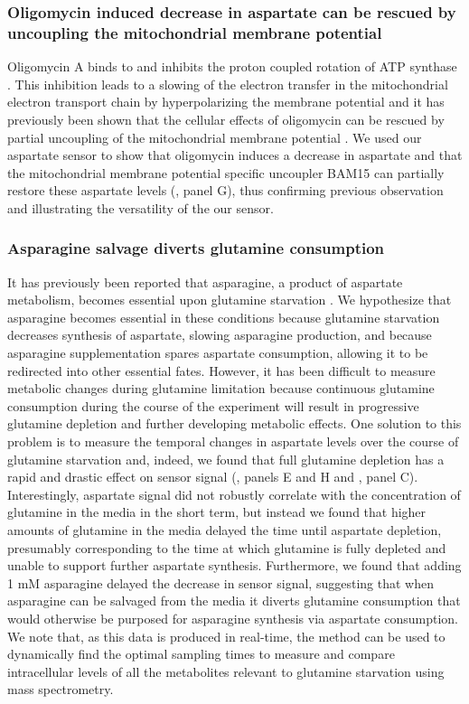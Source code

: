 \documentclass[9pt,lineno]{elife}
\begin{document}
\subsubsection{Oligomycin induced decrease in aspartate can be rescued by uncoupling the mitochondrial membrane potential}
Oligomycin A binds to and inhibits the proton coupled rotation of ATP synthase \citep{Symersky2012-dv}.
This inhibition leads to a slowing of the electron transfer in the mitochondrial electron transport chain by hyperpolarizing the membrane potential \citep{Brand2011-ms} and it has previously been shown that the cellular effects of oligomycin can be rescued by partial uncoupling of the mitochondrial membrane potential \citep{Sullivan2015-xf}. 
We used our aspartate sensor to show that oligomycin induces a decrease in aspartate and that the mitochondrial membrane potential specific uncoupler BAM15 \citep{Kenwood2014-ni} can partially restore these aspartate levels (, panel G), thus confirming previous observation and illustrating the versatility of the our sensor.




\subsubsection{Asparagine salvage diverts glutamine consumption}
It has previously been reported that asparagine, a product of aspartate metabolism, becomes essential upon glutamine starvation \citep{Pavlova2018-nl, Zhang2014-zz}.
We hypothesize that asparagine becomes essential in these conditions because glutamine starvation decreases synthesis of aspartate, slowing asparagine production, and because asparagine supplementation spares aspartate consumption, allowing it to be redirected into other essential fates.
However, it has been difficult to measure metabolic changes during glutamine limitation because continuous glutamine consumption during the course of the experiment will result in progressive glutamine depletion and further developing metabolic effects.
One solution to this problem is to measure the temporal changes in aspartate levels over the course of glutamine starvation and, indeed, we found that full glutamine depletion has a rapid and drastic effect on sensor signal (, panels E and H and , panel C).
Interestingly, aspartate signal did not robustly correlate with the concentration of glutamine in the media in the short term, but instead we found that higher amounts of glutamine in the media delayed the time until aspartate depletion, presumably corresponding to the time at which glutamine is fully depleted and unable to support further aspartate synthesis.
Furthermore, we found that adding 1 mM asparagine delayed the decrease in sensor signal, suggesting that when asparagine can be salvaged from the media it diverts glutamine consumption that would otherwise be purposed for asparagine synthesis via aspartate consumption.
We note that, as this data is produced in real-time, the method can be used to dynamically find the optimal sampling times to measure and compare intracellular levels of all the metabolites relevant to glutamine starvation using mass spectrometry.
\end{document}

